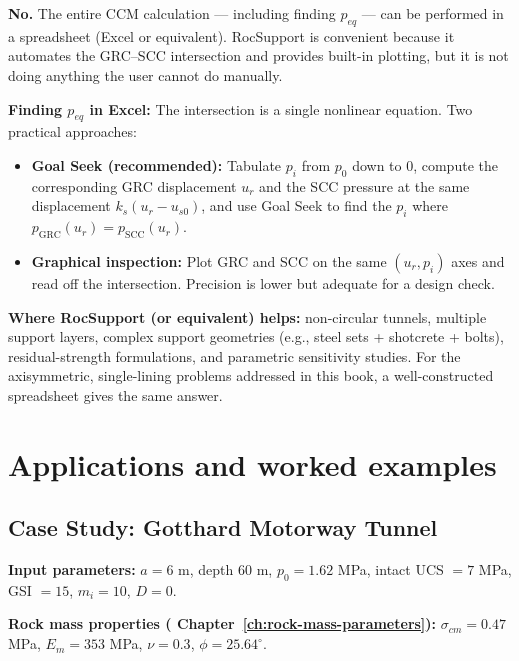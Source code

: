 \begin{notebox}
\textbf{No.} The entire CCM calculation --- including finding $p_{eq}$ --- can be performed in a spreadsheet (Excel or equivalent). RocSupport is convenient because it automates the GRC--SCC intersection and provides built-in plotting, but it is not doing anything the user cannot do manually.

\vspace{0.5em}


\textbf{Finding $p_{eq}$ in Excel:} The intersection is a single nonlinear equation. Two practical approaches:
\begin{itemize}[nosep]
 \item \textbf{Goal Seek (recommended):} Tabulate $p_i$ from $p_0$ down to $0$, compute the corresponding GRC displacement $u_r$ and the SCC pressure at the same displacement $k_s(u_r - u_{s0})$, and use Goal Seek to find the $p_i$ where $p_{\mathrm{GRC}}(u_r) = p_{\mathrm{SCC}}(u_r)$.
 \item \textbf{Graphical inspection:} Plot GRC and SCC on the same $(u_r, p_i)$ axes and read off the intersection. Precision is lower but adequate for a design check.
\end{itemize}
\vspace{0.5em}

\textbf{Where RocSupport (or equivalent) helps:} non-circular tunnels, multiple support layers, complex support geometries (e.g., steel sets + shotcrete + bolts), residual-strength formulations, and parametric sensitivity studies. For the axisymmetric, single-lining problems addressed in this book, a well-constructed spreadsheet gives the same answer.
\end{notebox}

\section{Applications and worked examples}
\label{sec:applications-and-worked-examples}

\subsection{Case Study: Gotthard Motorway Tunnel}
\textbf{Input parameters:} $a = 6$ m, depth $60$ m, $p_0 = 1.62$ MPa, intact UCS $= 7$ MPa, GSI $= 15$, $m_i = 10$, $D = 0$.

\textbf{Rock mass properties ( Chapter~\ref{ch:rock-mass-parameters}):} $\sigma_{cm} = 0.47$ MPa, $E_m = 353$ MPa, $\nu = 0.3$, $\phi = 25.64^\circ$.

